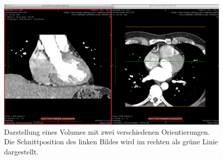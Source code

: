 \begin{figure}[t]
	\centering
	\includegraphics[width=0.8\linewidth]{img/c2_osirix_2d_view_splitscreen.jpg}
	\caption{Darstellung eines Volumes mit zwei verschiedenen Orientierungen. Die Schnittposition des linken Bildes wird im rechten als grüne Linie dargestellt.}
	\label{fig:osirix_2dView_splitWindow}
\end{figure}

